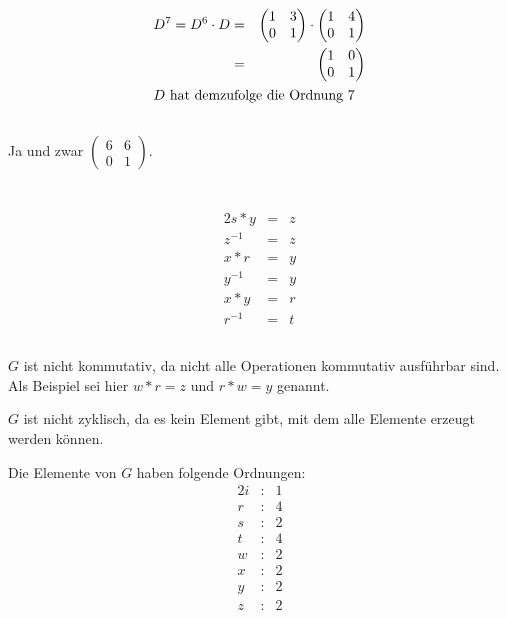 \documentclass[10pt,a4paper,oneside,ngerman,numbers=noenddot]{scrartcl}
\begin{document}
\begin{alignat*}{2}
D^{7} = D^{6} \cdot D &=& \begin{pmatrix} 1 & 3 \\ 0 & 1 \end{pmatrix} \cdot \begin{pmatrix} 1 & 4 \\ 0 & 1 \end{pmatrix} \\
&=& \begin{pmatrix} 1 & 0 \\ 0 & 1 \end{pmatrix} \\
\intertext{$D$ hat demzufolge die Ordnung $7$}
\end{alignat*}
\subsection{} %
Ja und zwar $\begin{pmatrix} 6 & 6 \\ 0 & 1 \end{pmatrix}$.
\section{} %
\subsection{} %
\begin{alignat*}{2}
s \ast y &=& z \\
z^{-1} &=& z \\
x \ast r &=& y \\
y^{-1} &=& y \\
x \ast y &=& r \\
r^{-1} &=& t
\end{alignat*}
\subsection{} %
$G$ ist nicht kommutativ, da nicht alle Operationen kommutativ ausführbar sind. Als Beispiel sei hier $w \ast r = z$ und $r \ast w = y$ genannt.

$G$ ist nicht zyklisch, da es kein Element gibt, mit dem alle Elemente erzeugt werden können.

Die Elemente von $G$ haben folgende Ordnungen:
\begin{alignat*}{2}
i &:& 1 \\
r &:& 4 \\
s &:& 2 \\
t &:& 4 \\
w &:& 2 \\
x &:& 2 \\
y &:& 2 \\
z &:& 2
\end{alignat*}
\end{document}
